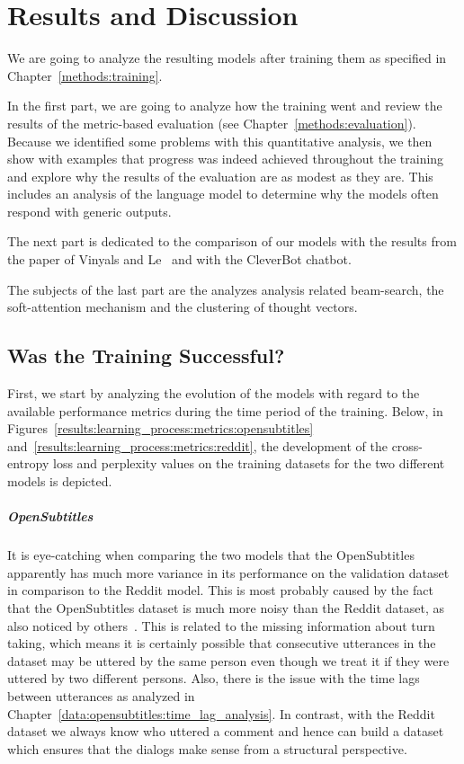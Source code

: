 \chapter{Results and Discussion}
\label{analysis_of_results}
We are going to analyze the resulting models after training them as specified in Chapter~\ref{methods:training}.

In the first part, we are going to analyze how the training went and review the results of the metric-based evaluation (see Chapter~\ref{methods:evaluation}). Because we identified some problems with this quantitative analysis, we then show with examples that progress was indeed achieved throughout the training and explore why the results of the evaluation are as modest as they are. This includes an analysis of the language model to determine why the models often respond with generic outputs.

The next part is dedicated to the comparison of our models with the results from the paper of Vinyals and Le~\cite{Vinyals:2015} and with the CleverBot chatbot.

The subjects of the last part are the analyzes analysis related beam-search, the soft-attention mechanism and the clustering of thought vectors.

\section{Was the Training Successful?}
First, we start by analyzing the evolution of the models with regard to the available performance metrics during the time period of the training. Below, in Figures~\ref{results:learning_process:metrics:opensubtitles} and~\ref{results:learning_process:metrics:reddit}, the development of the cross-entropy loss and perplexity values on the training datasets for the two different models is depicted.

\paragraph{OpenSubtitles} It is eye-catching when comparing the two models that the OpenSubtitles apparently has much more variance in its performance on the validation dataset in comparison to the Reddit model. This is most probably caused by the fact that the OpenSubtitles dataset is much more noisy than the Reddit dataset, as also noticed by others~\cite{Vinyals:2015}. This is related to the missing information about turn taking, which means it is certainly possible that consecutive utterances in the dataset may be uttered by the same person even though we treat it if they were uttered by two different persons. Also, there is the issue with the time lags between utterances as analyzed in Chapter~\ref{data:opensubtitles:time_lag_analysis}. In contrast, with the Reddit dataset we always know who uttered a comment and hence can build a dataset which ensures that the dialogs make sense from a structural perspective.

